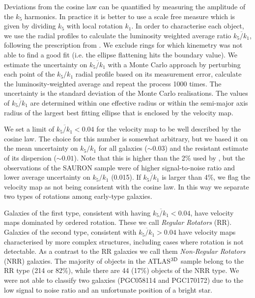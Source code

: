 \documentclass[usenatbib,usegraphicx]{mn2e}
\begin{document}
Deviations from the cosine law can be quantified by measuring the amplitude of the $k_5$ harmonics. In practice it is better to use a scale free measure which is given by dividing $k_5$ with local rotation $k_1$. In order to characterise each object, we use the radial profiles to calculate the luminosity weighted average ratio $\overline{k_5/k_1}$, following the prescription from \citet{1999ApJ...517..650R}. We exclude rings for which kinemetry was not able to find a good fit (i.e. the ellipse flattening hits the boundary value).  We estimate the uncertainty on $\overline{k_5/k_1}$ with a Monte Carlo approach by perturbing each point of the $k_5/k_1$ radial profile based on its measurement error, calculate the luminosity-weighted average and repeat the process 1000 times. The uncertainty is the standard deviation of the Monte Carlo realisations. The values of  $\overline{k_5/k_1}$ are determined within one effective radius or within the semi-major axis radius of the largest best fitting ellipse that is enclosed by the velocity map. 

We set a limit of $\overline{k_5/k_1} < 0.04$ for the velocity map to be well described by the cosine law. The choice for this number is somewhat arbitrary, but we based it on the mean uncertainty on $k_5/k_1$ for all galaxies ($\sim 0.03$) and the resistant estimate of its dispersion ($\sim 0.01$). Note that this is higher than  the 2\% used by \citet{2008MNRAS.390...93K}, but the observations of the SAURON sample were of higher signal-to-noise ratio and lower average uncertainty on $k_5/k_1$ (0.015). If $\overline{k_5/k_1}$ is larger than 4\%, we flag the velocity map as not being consistent with the cosine law. In this way we separate two types of rotations among early-type galaxies. 

Galaxies of the first type, consistent with having $\overline{k_5/k_1}<0.04$, have velocity maps dominated by ordered rotation. These we call  {\it Regular Rotators} (RR).  Galaxies of the second type, consistent with $\overline{k_5/k_1}>0.04$ have velocity maps characterised by more complex structures, including cases where rotation is not detectable. As a contrast to the RR galaxies we call them {\it Non-Regular Rotators} (NRR) galaxies.  The majority of objects in the ATLAS$^{\rm 3D}$ sample belong to the RR type (214 or 82\%), while there are 44 (17\%) objects of the NRR type. We were not able to classify two galaxies (PGC058114 and PGC170172) due to the low signal to noise ratio and an unfortunate position of a bright star. 
\end{document}

